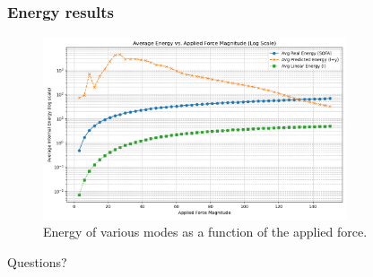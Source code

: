 \documentclass{beamer}
\begin{document}
\begin{frame}
    \frametitle{Energy results}
    
    \begin{figure}
        \centering
        \includegraphics[width=0.8\textwidth]{Images/avg_energy_vs_force_log.png}
        \caption{Energy of various modes as a function of the applied force.}
        \label{fig:linear_correlation}

    \end{figure}
    \end{frame}
\begin{frame}
    \begin{center}
        \color{blue} \Huge{Questions?}
    \end{center}

\end{frame}
\end{document}
